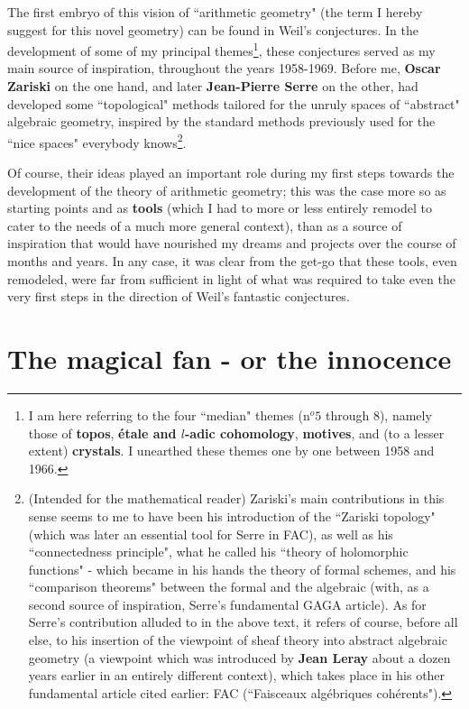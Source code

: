 The first embryo of this vision of ``arithmetic geometry" (the term I hereby suggest for this novel geometry) can be found in Weil's conjectures. In the development of some of my principal themes\footnote{I am here referring to the four ``median" themes (n$^o 5$ through $8$), namely those of \textbf{topos}, \textbf{\'etale and $l$-adic cohomology}, \textbf{motives}, and (to a lesser extent) \textbf{crystals}. I unearthed these themes one by one between 1958 and 1966.}, these conjectures served as my main source of inspiration, throughout the years 1958-1969. Before me, \textbf{Oscar Zariski} on the one hand, and later \textbf{Jean-Pierre Serre} on the other, had developed some ``topological" methods tailored for the unruly spaces of ``abstract" algebraic geometry, inspired by the standard methods previously used for the ``nice spaces" everybody knows\footnote{(Intended for the mathematical reader) Zariski's main contributions in this sense seems to me to have been his introduction of the ``Zariski topology" (which was later an essential tool for Serre in FAC), as well as his ``connectedness principle", what he called his ``theory of holomorphic functions" - which became in his hands the theory of formal schemes, and his ``comparison theorems" between the formal and the algebraic (with, as a second source of inspiration, Serre's fundamental GAGA article). As for Serre's contribution alluded to in the above text, it refers of course, before all else, to his insertion of the viewpoint of sheaf theory into abstract algebraic geometry (a viewpoint which was introduced by \textbf{Jean Leray} about a dozen years earlier in an entirely different context), which takes place in his other fundamental article cited earlier: FAC (``Faisceaux alg\'ebriques coh\'erents").}.

 Of course, their ideas played an important role during my first steps towards the development of the theory of arithmetic geometry; this was the case more so as starting points and as \textbf{tools} (which I had to more or less entirely remodel to cater to the needs of a much more general context), than as a source of inspiration that would have nourished my dreams and projects over the course of months and years. In any case, it was clear from the get-go that these tools, even remodeled, were far from sufficient in light of what was required to take even the very first steps in the direction of Weil's fantastic conjectures.

\section{The magical fan - or the innocence}

